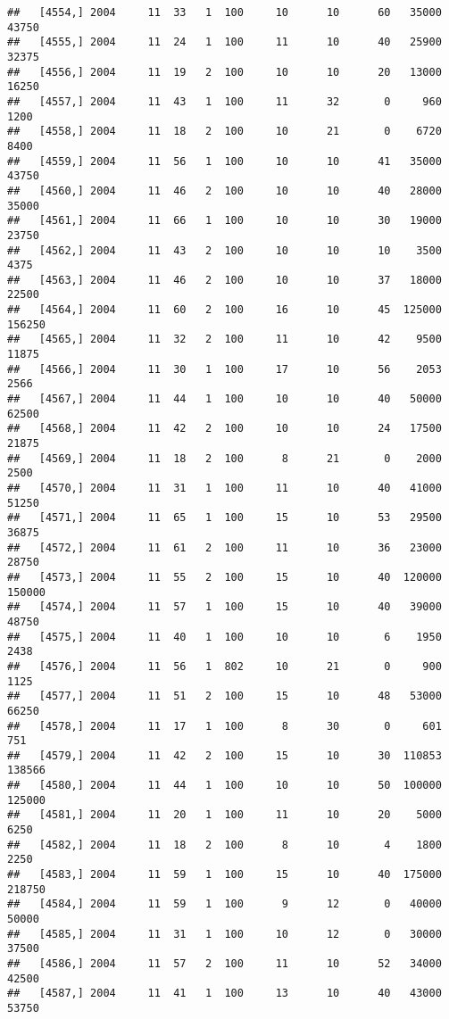 \documentclass{article}\usepackage[]{graphicx}\usepackage[]{color}
\makeatletter
\newenvironment{kframe}{%
 \def\at@end@of@kframe{}%
 \ifinner\ifhmode%
  \def\at@end@of@kframe{\end{minipage}}%
  \begin{minipage}{\columnwidth}%
 \fi\fi%
 \def\FrameCommand##1{\hskip\@totalleftmargin \hskip-\fboxsep
 \colorbox{shadecolor}{##1}\hskip-\fboxsep
     \hskip-\linewidth \hskip-\@totalleftmargin \hskip\columnwidth}%
 \MakeFramed {\advance\hsize-\width
   \@totalleftmargin\z@ \linewidth\hsize
   \@setminipage}}%
 {\par\unskip\endMakeFramed%
 \at@end@of@kframe}
\newenvironment{knitrout}{}{} %
\makeatother
\begin{document}
\begin{knitrout}
\begin{kframe}
\begin{verbatim}
##   [4554,] 2004     11  33   1  100     10      10      60   35000   43750
##   [4555,] 2004     11  24   1  100     11      10      40   25900   32375
##   [4556,] 2004     11  19   2  100     10      10      20   13000   16250
##   [4557,] 2004     11  43   1  100     11      32       0     960    1200
##   [4558,] 2004     11  18   2  100     10      21       0    6720    8400
##   [4559,] 2004     11  56   1  100     10      10      41   35000   43750
##   [4560,] 2004     11  46   2  100     10      10      40   28000   35000
##   [4561,] 2004     11  66   1  100     10      10      30   19000   23750
##   [4562,] 2004     11  43   2  100     10      10      10    3500    4375
##   [4563,] 2004     11  46   2  100     10      10      37   18000   22500
##   [4564,] 2004     11  60   2  100     16      10      45  125000  156250
##   [4565,] 2004     11  32   2  100     11      10      42    9500   11875
##   [4566,] 2004     11  30   1  100     17      10      56    2053    2566
##   [4567,] 2004     11  44   1  100     10      10      40   50000   62500
##   [4568,] 2004     11  42   2  100     10      10      24   17500   21875
##   [4569,] 2004     11  18   2  100      8      21       0    2000    2500
##   [4570,] 2004     11  31   1  100     11      10      40   41000   51250
##   [4571,] 2004     11  65   1  100     15      10      53   29500   36875
##   [4572,] 2004     11  61   2  100     11      10      36   23000   28750
##   [4573,] 2004     11  55   2  100     15      10      40  120000  150000
##   [4574,] 2004     11  57   1  100     15      10      40   39000   48750
##   [4575,] 2004     11  40   1  100     10      10       6    1950    2438
##   [4576,] 2004     11  56   1  802     10      21       0     900    1125
##   [4577,] 2004     11  51   2  100     15      10      48   53000   66250
##   [4578,] 2004     11  17   1  100      8      30       0     601     751
##   [4579,] 2004     11  42   2  100     15      10      30  110853  138566
##   [4580,] 2004     11  44   1  100     10      10      50  100000  125000
##   [4581,] 2004     11  20   1  100     11      10      20    5000    6250
##   [4582,] 2004     11  18   2  100      8      10       4    1800    2250
##   [4583,] 2004     11  59   1  100     15      10      40  175000  218750
##   [4584,] 2004     11  59   1  100      9      12       0   40000   50000
##   [4585,] 2004     11  31   1  100     10      12       0   30000   37500
##   [4586,] 2004     11  57   2  100     11      10      52   34000   42500
##   [4587,] 2004     11  41   1  100     13      10      40   43000   53750

\end{verbatim}
\end{kframe}
\end{knitrout}
\end{document}
